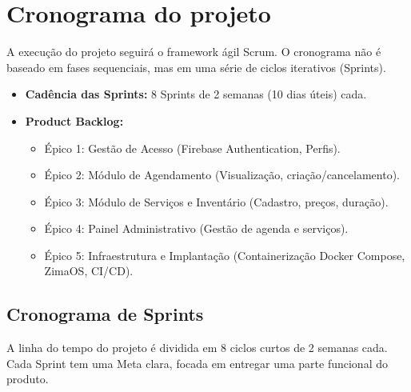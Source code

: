 \documentclass[
    12pt, 
    a4paper, 
    oneside, 
    chapter=TITLE, 
    section=TITLE
]{abntex2}
\begin{document}
\section{Cronograma do projeto}
A execução do projeto seguirá o framework ágil Scrum. O cronograma não é baseado em fases sequenciais, mas em uma série de ciclos iterativos (Sprints).
\begin{itemize}
    \item \textbf{Cadência das Sprints:} 8 Sprints de 2 semanas (10 dias úteis) cada.
    \item \textbf{Product Backlog:}
        \begin{itemize}
            \item Épico 1: Gestão de Acesso (Firebase Authentication, Perfis).
            \item Épico 2: Módulo de Agendamento (Visualização, criação/cancelamento).
            \item Épico 3: Módulo de Serviços e Inventário (Cadastro, preços, duração).
            \item Épico 4: Painel Administrativo (Gestão de agenda e serviços).
            \item Épico 5: Infraestrutura e Implantação (Containerização Docker Compose, ZimaOS, CI/CD).
        \end{itemize}
\end{itemize}

\subsection{Cronograma de Sprints}
A linha do tempo do projeto é dividida em 8 ciclos curtos de 2 semanas cada. Cada Sprint tem uma Meta clara, focada em entregar uma parte funcional do produto.
\end{document}
